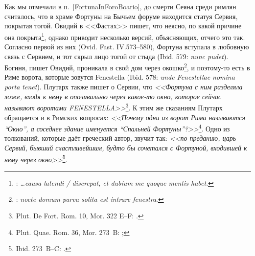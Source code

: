

Как мы отмечали в п.~\ref{FortunaInForoBoario}, до смерти Сеяна среди римлян считалось, что в храме Фортуны на Бычьем форуме находится статуя Сервия, покрытая тогой. Овидий в <<Фастах>> пишет, что неясно, по какой причине она покрыта\footnote{: \textit{\ldots{}causa latendi / discrepat, et dubium me quoque mentis habet}.}, однако приводит несколько версий, объясняющих, отчего это так. Согласно первой из них (Ovid. Fast. IV.573--580), Фортуна вступала в любовную связь с Сервием, и тот скрыл лицо тогой от стыда (Ibid. 579: \textit{nunc pudet}). Богиня, пишет Овидий, проникала в свой дом через окошко\footnote{: \textit{nocte domum parva solita est intrare fenestra}.}, и поэтому-то есть в Риме ворота, которые зовутся Fenestella (Ibid. 578: \textit{unde Fenestellae nomina porta tenet}). Плутарх также пишет о Сервии, что \textit{<<Фортуна с ним разделяла ложе, входя к нему в опочивальню через какое-то окно, которое сейчас называют воротами FENESTELLA>>}\footnote{Plut. De Fort. Rom. 10, Mor. 322 E--F: .}. К этим же сказаниям Плутарх обращается и в Римских вопросах: \textit{<<Почему одни из ворот Рима называются ``Окно'', а соседнее здание именуется ``Спальней Фортуны''?>>}\footnote{Plut. Quae. Rom. 36, Mor. 273~B: ;}. Одно из толкований, которые даёт греческий автор, звучит так: \textit{<<по преданию, царь Сервий, бывший счастливейшим, будто бы сочетался с Фортуной, входившей к нему через окно>>}\footnote{Ibid. 273~B--C: .}.

